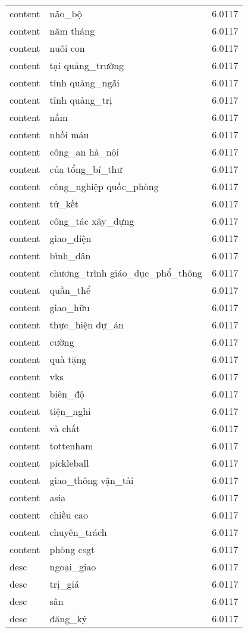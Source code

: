 \documentclass{article}
\begin{document}
\begin{tabular}{lll}
content & não\_bộ & 6.0117\\
content & năm tháng & 6.0117\\
content & nuôi con & 6.0117\\
content & tại quảng\_trường & 6.0117\\
content & tỉnh quảng\_ngãi & 6.0117\\
content & tỉnh quảng\_trị & 6.0117\\
content & nấm & 6.0117\\
content & nhồi máu & 6.0117\\
content & công\_an hà\_nội & 6.0117\\
content & của tổng\_bí\_thư & 6.0117\\
content & công\_nghiệp quốc\_phòng & 6.0117\\
content & tứ\_kết & 6.0117\\
content & công\_tác xây\_dựng & 6.0117\\
content & giao\_diện & 6.0117\\
content & bình\_dân & 6.0117\\
content & chương\_trình giáo\_dục\_phổ\_thông & 6.0117\\
content & quần\_thể & 6.0117\\
content & giao\_hữu & 6.0117\\
content & thực\_hiện dự\_án & 6.0117\\
content & cường & 6.0117\\
content & quà tặng & 6.0117\\
content & vks & 6.0117\\
content & biên\_độ & 6.0117\\
content & tiện\_nghi & 6.0117\\
content & và chất & 6.0117\\
content & tottenham & 6.0117\\
content & pickleball & 6.0117\\
content & giao\_thông vận\_tải & 6.0117\\
content & asia & 6.0117\\
content & chiều cao & 6.0117\\
content & chuyên\_trách & 6.0117\\
content & phòng csgt & 6.0117\\
desc & ngoại\_giao & 6.0117\\
desc & trị\_giá & 6.0117\\
desc & sân & 6.0117\\
desc & đăng\_ký & 6.0117\\

\end{tabular}
\end{document}
